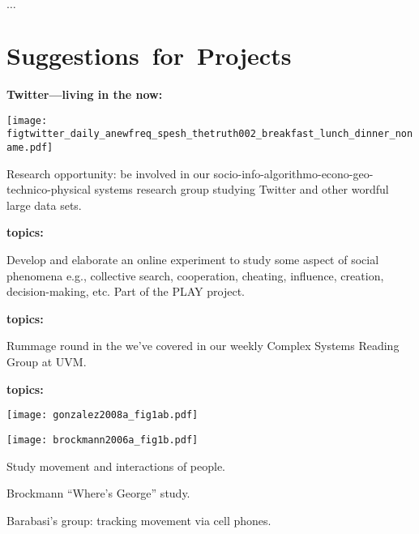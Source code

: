       $\ldots$
    
  


\section{Suggestions\ for\ Projects}



  \textbf{Twitter---living in the now:}

  
    \texttt{[image: figtwitter\_daily\_anewfreq\_spesh\_thetruth002\_breakfast\_lunch\_dinner\_noname.pdf]}
    
     
      Research opportunity: be involved in our socio-info-algorithmo-econo-geo-technico-physical systems research group
      studying Twitter and other wordful large data sets.
    
  


      \textbf{topics:}

    
    
        
      Develop and elaborate an \alert{online experiment}
      to study some aspect of \alert{social phenomena}
     e.g., 
      collective search, 
      cooperation, 
      cheating, 
      influence, 
      creation,
      decision-making, 
      etc.
     Part of the PLAY project.
    
    

  

  \textbf{topics:}
  
  
    Rummage round in the 
    we've covered
    in our weekly Complex Systems Reading Group at UVM.
  




  \textbf{topics:}

  
            
      \texttt{[image: gonzalez2008a\_fig1ab.pdf]}
        
      \texttt{[image: brockmann2006a\_fig1b.pdf]}
      
       
        Study movement and interactions of people.
       
        Brockmann \etal\cite{brockmann2006a} ``Where's George'' study.
       
        Barabasi's group: tracking movement
        via cell phones\cite{gonzalez2008a}.
      
      







